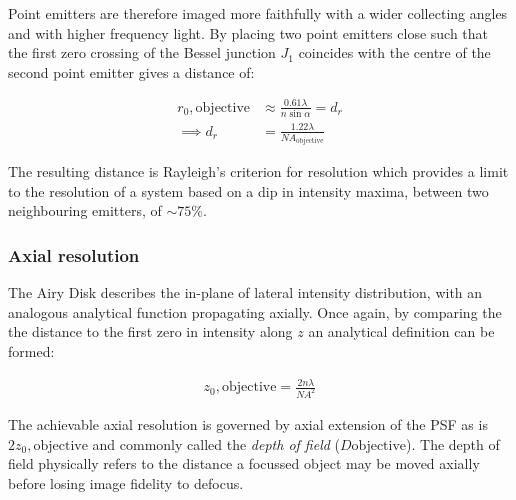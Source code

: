 Point emitters are therefore imaged more faithfully with a wider collecting angles and with higher frequency light.
By placing two point emitters close such that the first zero crossing of the Bessel junction $J_1$ coincides with the centre of the second point emitter gives a distance of:

\begin{align}
    r_0,\text{objective} &\approx \frac{0.61\lambda}{n\sin\alpha} = d_r \\
    \implies d_r &= \frac{1.22 \lambda}{NA_{\text{objective}}}
\end{align}

The resulting distance is Rayleigh's criterion for resolution which provides a limit to the resolution of a system based on a dip in intensity maxima, between two neighbouring emitters, of $\sim 75\%$.

\subsubsection{Axial resolution}

The Airy Disk describes the in-plane of lateral intensity distribution, with an analogous analytical function propagating axially.
Once again, by comparing the the distance to the first zero in intensity along $z$ an analytical definition can be formed:

\begin{align}
    z_0,\text{objective} = \frac{2n\lambda}{NA^2} \label{eq:}
\end{align}

The achievable axial resolution is governed by axial extension of the PSF as is $2z_0,\text{objective}$ and commonly called the \emph{depth of field} ($D\text{objective}$).
The depth of field physically refers to the distance a focussed object may be moved axially before losing image fidelity to defocus.


